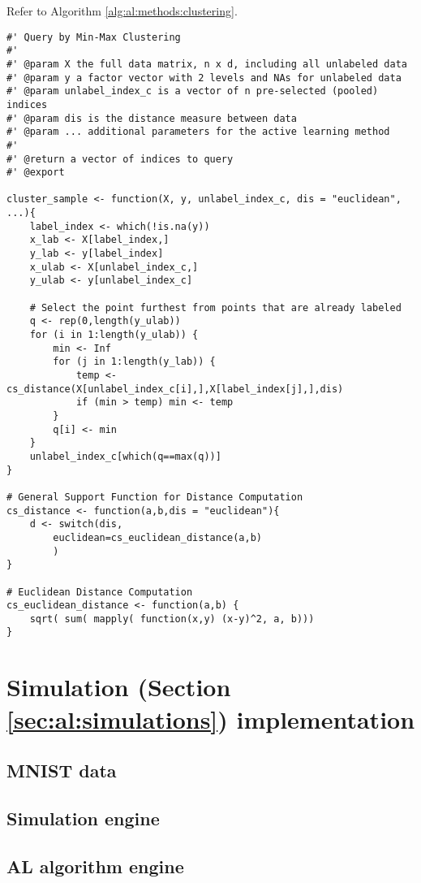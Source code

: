 Refer to Algorithm \ref{alg:al:methods:clustering}. 
{
\begin{lstlisting}
#' Query by Min-Max Clustering
#'
#' @param X the full data matrix, n x d, including all unlabeled data
#' @param y a factor vector with 2 levels and NAs for unlabeled data
#' @param unlabel_index_c is a vector of n pre-selected (pooled) indices
#' @param dis is the distance measure between data
#' @param ... additional parameters for the active learning method
#'
#' @return a vector of indices to query
#' @export

cluster_sample <- function(X, y, unlabel_index_c, dis = "euclidean", ...){
	label_index <- which(!is.na(y))
	x_lab <- X[label_index,]
	y_lab <- y[label_index]
	x_ulab <- X[unlabel_index_c,]
	y_ulab <- y[unlabel_index_c]
	
	# Select the point furthest from points that are already labeled
	q <- rep(0,length(y_ulab))
	for (i in 1:length(y_ulab)) {
		min <- Inf
		for (j in 1:length(y_lab)) {
			temp <- cs_distance(X[unlabel_index_c[i],],X[label_index[j],],dis)
			if (min > temp) min <- temp
		}
		q[i] <- min
	}
	unlabel_index_c[which(q==max(q))]
}

# General Support Function for Distance Computation
cs_distance <- function(a,b,dis = "euclidean"){
	d <- switch(dis,
		euclidean=cs_euclidean_distance(a,b)
		)
}

# Euclidean Distance Computation
cs_euclidean_distance <- function(a,b) {
	sqrt( sum( mapply( function(x,y) (x-y)^2, a, b)))
}
\end{lstlisting}
}

\section{Simulation (Section \ref{sec:al:simulations}) implementation}
\label{sec:appendicies:al:simulations}

\subsection{MNIST data}
\label{sec:appendicies:al:simulations:data}

\subsection{Simulation engine}
\label{sec:appendicies:al:simulations:simengine}

\subsection{AL algorithm engine}
\label{sec:appendicies:al:simulations:alengine}


